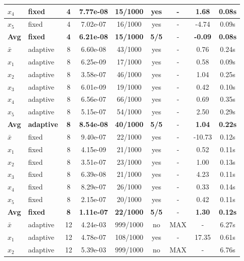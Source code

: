 \begin{longtable}{|l|l|c|c|c|c|c|c|c|}
\hline
$x_4$ & fixed & 4 & 7.77e-08 & 15/1000 & yes & - & 1.68 & 0.08s \\
\hline
$x_5$ & fixed & 4 & 7.02e-07 & 16/1000 & yes & - & -4.74 & 0.09s \\
\hline
\hline\hline
\textbf{Avg} & \textbf{fixed} & \textbf{4} & \textbf{6.21e-08} & \textbf{15/1000} & \textbf{5/5} & - & \textbf{-0.09} & \textbf{0.08s} \\
\hline\hline
$\bar{x}$ & adaptive & 8 & 6.60e-08 & 43/1000 & yes & - & 0.76 & 0.24s \\
\hline
$x_1$ & adaptive & 8 & 6.25e-09 & 17/1000 & yes & - & 0.58 & 0.09s \\
\hline
$x_2$ & adaptive & 8 & 3.58e-07 & 46/1000 & yes & - & 1.04 & 0.25s \\
\hline
$x_3$ & adaptive & 8 & 6.01e-09 & 19/1000 & yes & - & 0.42 & 0.10s \\
\hline
$x_4$ & adaptive & 8 & 6.56e-07 & 66/1000 & yes & - & 0.69 & 0.35s \\
\hline
$x_5$ & adaptive & 8 & 5.15e-07 & 54/1000 & yes & - & 2.50 & 0.29s \\
\hline
\hline\hline
\textbf{Avg} & \textbf{adaptive} & \textbf{8} & \textbf{8.54e-08} & \textbf{40/1000} & \textbf{5/5} & - & \textbf{1.04} & \textbf{0.22s} \\
\hline\hline
\hline
$\bar{x}$ & fixed & 8 & 9.40e-07 & 22/1000 & yes & - & -10.73 & 0.12s \\
\hline
$x_1$ & fixed & 8 & 4.15e-09 & 21/1000 & yes & - & 0.52 & 0.11s \\
\hline
$x_2$ & fixed & 8 & 3.51e-07 & 23/1000 & yes & - & 1.00 & 0.13s \\
\hline
$x_3$ & fixed & 8 & 6.39e-08 & 21/1000 & yes & - & 4.23 & 0.11s \\
\hline
$x_4$ & fixed & 8 & 8.29e-07 & 26/1000 & yes & - & 0.33 & 0.14s \\
\hline
$x_5$ & fixed & 8 & 2.15e-07 & 20/1000 & yes & - & 0.42 & 0.11s \\
\hline
\hline\hline
\textbf{Avg} & \textbf{fixed} & \textbf{8} & \textbf{1.11e-07} & \textbf{22/1000} & \textbf{5/5} & - & \textbf{1.30} & \textbf{0.12s} \\
\hline\hline
$\bar{x}$ & adaptive & 12 & 4.24e-03 & 999/1000 & no & MAX & - & 6.27s \\
\hline
$x_1$ & adaptive & 12 & 4.78e-07 & 108/1000 & yes & - & 17.35 & 0.61s \\
\hline
$x_2$ & adaptive & 12 & 5.39e-03 & 999/1000 & no & MAX & - & 6.76s \\

\end{longtable}
